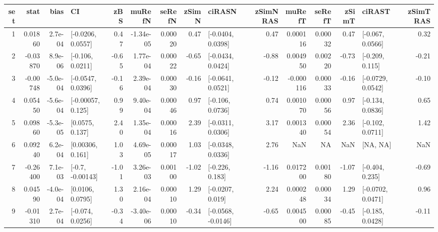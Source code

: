 
\begin{tabular}{r|r|r|l|r|r|r|r|l|r|r|r|r|l|r}
\hline
set & stat & bias & CI & zBS & muRefN & seRefN & zSimN & ciRASN & zSimNRAS & muRefT & seRefT & zSimT & ciRAST & zSimTRAS\\
\hline
1 & 0.01860 & 2.7e-04 & [-0.0206, 0.0557] & 0.47 & -1.34e-05 & 0.00020 & 0.47 & [-0.0404, 0.0398] & 0.47 & 0.000116 & 0.00032 & 0.47 & [-0.067, 0.0566] & 0.32\\
\hline
2 & -0.03870 & 8.9e-06 & [-0.106, 0.0211] & -0.65 & 1.77e-04 & 0.00022 & -0.65 & [-0.0434, 0.0424] & -0.88 & 0.004950 & 0.00220 & -0.73 & [-0.209, 0.115] & -0.21\\
\hline
3 & -0.00748 & -5.0e-04 & [-0.0547, 0.0396] & -0.16 & 2.39e-04 & 0.00030 & -0.16 & [-0.0641, 0.0521] & -0.12 & -0.000116 & 0.00033 & -0.16 & [-0.0729, 0.0542] & -0.10\\
\hline
4 & 0.05450 & -5.6e-04 & [-0.00057, 0.125] & 0.99 & 9.40e-04 & 0.00046 & 0.97 & [-0.106, 0.0736] & 0.74 & 0.001070 & 0.00056 & 0.97 & [-0.134, 0.0836] & 0.65\\
\hline
5 & 0.09860 & -5.3e-05 & [0.0575, 0.137] & 2.40 & 1.35e-04 & 0.00016 & 2.39 & [-0.0311, 0.0306] & 3.17 & 0.001340 & 0.00054 & 2.36 & [-0.102, 0.0711] & 1.42\\
\hline
6 & 0.09240 & 6.2e-04 & [0.00306, 0.161] & 1.03 & 4.69e-05 & 0.00017 & 1.03 & [-0.0348, 0.0336] & 2.76 & NaN & NA & NaN & [NA, NA] & NaN\\
\hline
7 & -0.26400 & 7.1e-03 & [-0.7, -0.00143] & -1.01 & 3.26e-03 & 0.00100 & -1.02 & [-0.226, 0.183] & -1.16 & 0.017200 & 0.00180 & -1.07 & [-0.404, 0.235] & -0.69\\
\hline
8 & 0.04590 & -4.0e-04 & [0.0106, 0.0795] & 1.30 & 2.16e-04 & 0.00010 & 1.29 & [-0.0207, 0.019] & 2.24 & 0.000248 & 0.00034 & 1.29 & [-0.0702, 0.0471] & 0.96\\
\hline
9 & -0.01310 & 2.7e-04 & [-0.074, 0.0256] & -0.34 & -3.40e-06 & 0.00010 & -0.34 & [-0.0568, -0.0146] & -0.65 & 0.004500 & 0.00085 & -0.45 & [-0.185, 0.0428] & -0.11\\
\hline
\end{tabular}

